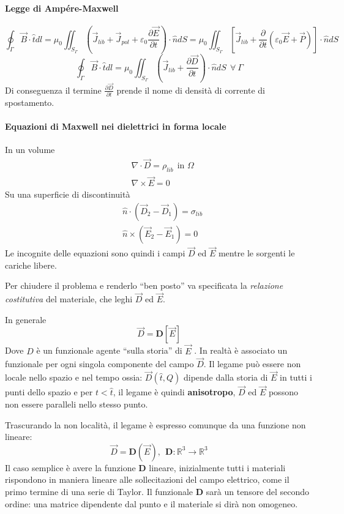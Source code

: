 \paragraph{Legge di Ampére-Maxwell}
$$
\oint_{\Gamma} \vec{B}\cdot\hat{t} dl = \mu_0 \iint_{S_\Gamma}\left( \vec{J}_{lib} + \vec{J}_{pol} + \varepsilon_0\frac{\partial 
\vec{E}}{\partial t}\right) \cdot \hat{n}dS =
\mu_0 \iint_{S_\Gamma}\left[\vec{J}_{lib} + 
\frac{\partial}{\partial t} \left(\varepsilon_0\vec{E}+\vec{P}\right)\right] \cdot \hat{n}dS 
$$
$$
\oint_{\Gamma} \vec{B}\cdot \hat{t} dl = \mu_0 \iint_{S_\Gamma} 
\left(\vec{J}_{lib} + \frac{\partial \vec{D}}{\partial t}\right)\cdot
\hat{n}dS\ \ \forall\ \Gamma
$$
Di conseguenza il termine $\frac{\partial \vec{D}}{\partial t}$ prende
il nome di densità di corrente di spostamento.

\paragraph{Equazioni di Maxwell nei dielettrici in forma locale}
In un volume
\begin{align*}
&\nabla \cdot\vec{D} = \rho_{lib}\ \ \text{in }\Omega\\
&\nabla \times \vec{E} = 0
\end{align*}
Su una superficie di discontinuità
\begin{align*}
&\hat{n}\cdot\left(\vec{D}_2-\vec{D}_1\right) = \sigma_{lib}\\
&\hat{n}\times\left(\vec{E}_2-\vec{E}_1\right) = 0
\end{align*}
Le incognite delle equazioni sono quindi i campi $\vec{D}$ ed 
$\vec{E}$ mentre le sorgenti le cariche libere.

Per chiudere il problema e renderlo ``ben posto'' va specificata
la \textit{relazione costitutiva} del materiale, che leghi
$\vec{D}$ ed $\vec{E}$.

In generale
$$
\vec{D} = \mathbf{D}[\vec{E}]
$$
Dove $D$ è un funzionale agente ``sulla storia'' di $\vec{E}$ 
.
In realtà è associato un funzionale per ogni singola componente
del campo $\vec{D}$.
Il legame può essere non locale nello spazio e nel tempo ossia:
$\vec{D}(\hat{t},Q)$ dipende dalla storia di $\vec{E}$ in tutti 
i punti dello spazio e per $t < \hat{t}$, il legame è quindi
\textbf{anisotropo}, $\vec{D}$ ed $\vec{E}$ possono non essere
paralleli nello stesso punto.

Trascurando la non località, il legame è espresso comunque da una 
funzione non lineare:
$$
\vec{D} = \mathbf{D}(\vec{E}),\ \ \mathbf{D}: \mathbb{R}^3 \to \mathbb{R}^3
$$
Il caso semplice è avere la funzione $\mathbf{D}$ lineare, 
inizialmente tutti i materiali rispondono in 
maniera lineare alle sollecitazioni del campo elettrico, come
il primo termine di una serie di Taylor. Il funzionale $\mathbf{D}$ 
sarà un tensore del secondo ordine: una matrice dipendente dal 
punto e il materiale si dirà non omogeneo.

